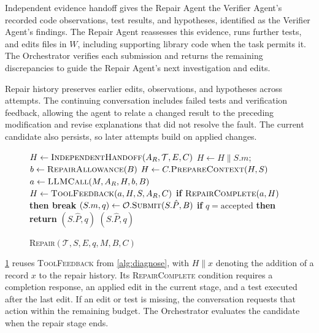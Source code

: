 {
\setlength{\intextsep}{0pt}

Independent evidence handoff gives the Repair Agent the Verifier Agent's recorded code observations, test results, and hypotheses, identified as the Verifier Agent's findings. The Repair Agent reassesses this evidence, runs further tests, and edits files in $W$, including supporting library code when the task permits it. The Orchestrator verifies each submission and returns the remaining discrepancies to guide the Repair Agent's next investigation and edits.

Repair history preserves earlier edits, observations, and hypotheses across attempts. The continuing conversation includes failed tests and verification feedback, allowing the agent to relate a changed result to the preceding modification and revise explanations that did not resolve the fault. The current candidate also persists, so later attempts build on applied changes.

\begin{figure}
\begin{minipage}{\linewidth}
\begin{algorithm}[H]
\caption{\textsc{Repair}$(\mathcal T,S,E,q,M,B,C)$}
\label{alg:repair}
\raggedright
\small
\begin{algorithmic}[1]
\State $H\gets\Call{IndependentHandoff}{A_R,\mathcal T,E,C}$
  \State $H\gets H\mathbin{\|}S.m$; $b\gets\Call{RepairAllowance}{B}$
    \State $H\gets C.\Call{PrepareContext}{H,S}$
    \State $a\gets\Call{LLMCall}{M,A_R,H,b,B}$ 
    \State $H\gets\Call{ToolFeedback}{a,H,S,A_R,C}$
    \State \textbf{if} $\Call{RepairComplete}{a,H}$ \textbf{then break}
  \EndWhile
  \State $(S.m,q)\gets\mathcal O.\Call{Submit}{S.\hat P,B}$
  \State \textbf{if} $q=\mathrm{accepted}$ \textbf{then return} $(S.\hat P,q)$
\EndWhile
\State \Return $(S.\hat P,q)$
\end{algorithmic}
\end{algorithm}
\end{minipage}
\end{figure}
\cref{alg:repair} reuses \textsc{ToolFeedback} from \cref{alg:diagnose}, with $H\mathbin{\|}x$ denoting the addition of a record $x$ to the repair history. Its \textsc{RepairComplete} condition requires a completion response, an applied edit in the current stage, and a test executed after the last edit. If an edit or test is missing, the conversation requests that action within the remaining budget. The Orchestrator evaluates the candidate when the repair stage ends.\par}

